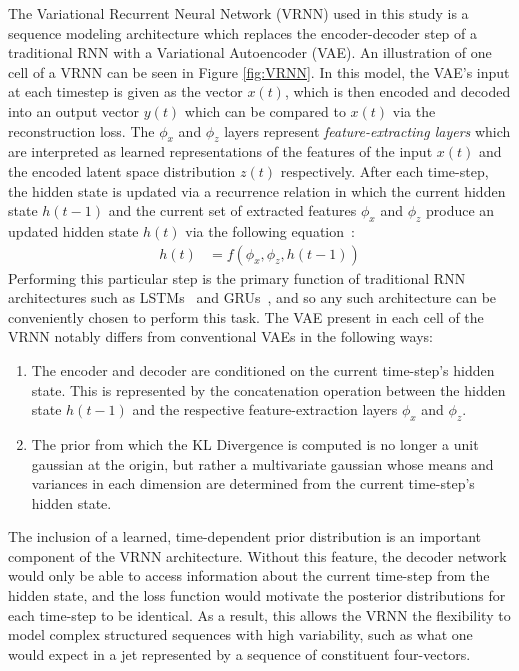 \documentclass[12pt, a4paper]{article}
\begin{document}
The Variational Recurrent Neural Network (VRNN) used in this study is a sequence modeling architecture
which replaces the encoder-decoder step of a traditional RNN with a Variational
Autoencoder (VAE). An illustration of one cell of a VRNN can be seen
in Figure \ref{fig:VRNN}. 
In this model, the VAE's input at each timestep is given as the vector $x(t)$, which is then encoded and decoded into an output vector $y(t)$ which can be compared to $x(t)$ via the reconstruction loss.
The $\phi_{x}$ and $\phi_{z}$ layers represent \textit{feature-extracting layers} which are interpreted as learned representations of the features of the input $x(t)$ and the encoded latent space distribution $z(t)$ respectively. After each time-step, the hidden state is updated via a recurrence relation in which the current hidden state $h(t-1)$ and the current set of extracted features $\phi_{x}$ and $\phi_{z}$ produce an updated hidden state $h(t)$ via the following equation~\cite{chung2016recurrent}:
\begin{align*}
h(t) &= f(\phi_{x}, \phi_{z}, h(t-1))
\end{align*} 
Performing this particular step is the primary function of traditional RNN architectures such as LSTMs~\cite{lstm} and GRUs~\cite{cho2014learning}, and so any such architecture can be conveniently chosen to perform this task.
The VAE present in each cell of the VRNN notably differs from
conventional VAEs in the following ways:
\begin{enumerate}
  \item{The encoder and decoder are conditioned on the current time-step's hidden state.
  This is represented by the concatenation operation between the hidden state $h(t-1)$ and the respective feature-extraction layers $\phi_{x}$ and $\phi_{z}$.}
  \item{The prior from which the KL Divergence is computed is no longer a unit gaussian
  at the origin, but rather a multivariate gaussian whose means and variances in each 
  dimension are determined from the current time-step's hidden state.}
\end{enumerate}


The inclusion of a learned, time-dependent prior distribution is an important component of the VRNN architecture. Without this feature, the decoder network would only be able to access information about the current time-step from the hidden state, and the loss function would motivate the posterior distributions for each time-step to be identical. As a result, this allows the VRNN the flexibility to model complex structured sequences with high variability, such as what one would expect in a jet represented by a sequence of constituent four-vectors.
\end{document}
